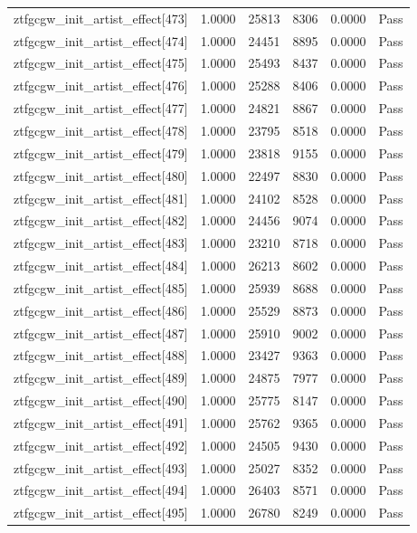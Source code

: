 \begin{table}[htbp]
\begin{tabular}{llrrll}
ztfgcgw\_init\_artist\_effect[473] & 1.0000 & 25813 & 8306 & 0.0000 & Pass \\
ztfgcgw\_init\_artist\_effect[474] & 1.0000 & 24451 & 8895 & 0.0000 & Pass \\
ztfgcgw\_init\_artist\_effect[475] & 1.0000 & 25493 & 8437 & 0.0000 & Pass \\
ztfgcgw\_init\_artist\_effect[476] & 1.0000 & 25288 & 8406 & 0.0000 & Pass \\
ztfgcgw\_init\_artist\_effect[477] & 1.0000 & 24821 & 8867 & 0.0000 & Pass \\
ztfgcgw\_init\_artist\_effect[478] & 1.0000 & 23795 & 8518 & 0.0000 & Pass \\
ztfgcgw\_init\_artist\_effect[479] & 1.0000 & 23818 & 9155 & 0.0000 & Pass \\
ztfgcgw\_init\_artist\_effect[480] & 1.0000 & 22497 & 8830 & 0.0000 & Pass \\
ztfgcgw\_init\_artist\_effect[481] & 1.0000 & 24102 & 8528 & 0.0000 & Pass \\
ztfgcgw\_init\_artist\_effect[482] & 1.0000 & 24456 & 9074 & 0.0000 & Pass \\
ztfgcgw\_init\_artist\_effect[483] & 1.0000 & 23210 & 8718 & 0.0000 & Pass \\
ztfgcgw\_init\_artist\_effect[484] & 1.0000 & 26213 & 8602 & 0.0000 & Pass \\
ztfgcgw\_init\_artist\_effect[485] & 1.0000 & 25939 & 8688 & 0.0000 & Pass \\
ztfgcgw\_init\_artist\_effect[486] & 1.0000 & 25529 & 8873 & 0.0000 & Pass \\
ztfgcgw\_init\_artist\_effect[487] & 1.0000 & 25910 & 9002 & 0.0000 & Pass \\
ztfgcgw\_init\_artist\_effect[488] & 1.0000 & 23427 & 9363 & 0.0000 & Pass \\
ztfgcgw\_init\_artist\_effect[489] & 1.0000 & 24875 & 7977 & 0.0000 & Pass \\
ztfgcgw\_init\_artist\_effect[490] & 1.0000 & 25775 & 8147 & 0.0000 & Pass \\
ztfgcgw\_init\_artist\_effect[491] & 1.0000 & 25762 & 9365 & 0.0000 & Pass \\
ztfgcgw\_init\_artist\_effect[492] & 1.0000 & 24505 & 9430 & 0.0000 & Pass \\
ztfgcgw\_init\_artist\_effect[493] & 1.0000 & 25027 & 8352 & 0.0000 & Pass \\
ztfgcgw\_init\_artist\_effect[494] & 1.0000 & 26403 & 8571 & 0.0000 & Pass \\
ztfgcgw\_init\_artist\_effect[495] & 1.0000 & 26780 & 8249 & 0.0000 & Pass \\

\end{tabular}
\end{table}
